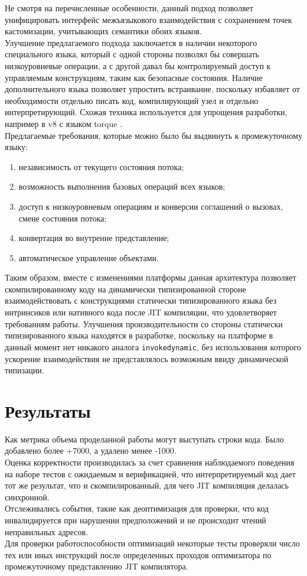 \documentclass[times,specification,annotation]{itmo-student-thesis}
\begin{document}
\chapterconclusion
Не смотря на перечисленные особенности, данный подход позволяет унифицировать интерфейс межъязыкового взаимодействия с сохранением точек кастомизации, учитывающих семантики обоих языков.\\
Улучшение предлагаемого подхода заключается в наличии некоторого специального языка, который с одной стороны позволял бы совершать низкоуровневые операции, а с другой давал бы контролируемый доступ к управляемым конструкциям, таким как безопасные состояния. Наличие дополнительного языка позволяет упростить встраивание, поскольку избавляет от необходимости отдельно писать код, компилирующий узел и отдельно интерпретирующий. Схожая техника используется для упрощения разработки, например в v8 с языком torque \cite{torque}.\\
Предлагаемые требования, которые можно было бы выдвинуть к промежуточному языку:
\begin{enumerate}
	\item независимость от текущего состояния потока;
	\item возможность выполнения базовых операций всех языков;
	\item доступ к низкоуровневым операциям и конверсии соглашений о вызовах, смене состояния потока;
	\item конвертация во внутренне представление;
	\item автоматическое управление объектами.
\end{enumerate}
Таким образом, вместе с изменениями платформы данная архитектура позволяет скомпилированному коду на динамически типизированной стороне взаимодействовать с конструкциями статически типизированного языка без интринсиков или нативного кода после JIT компиляции, что удовлетворяет требованиям работы. Улучшения производительности со стороны статически типизированного языка находятся в разработке, поскольку на платформе в данный момент нет никакого аналога \texttt{invokedynamic}, без использования которого ускорение взаимодействия не представлялось возможным ввиду динамической типизации.

\chapter{Результаты}\label{ch:results}
Как метрика объема проделанной работы могут выступать строки кода. Было добавлено более {\color{green}+7000}, а удалено менее {\color{red}-1000}.\\

Оценка корректности производилась за счет сравнения наблюдаемого поведения на наборе тестов с ожидаемым и верификацией, что интерпретируемый код дает тот же результат, что и скомпилированный, для чего JIT компиляция делалась синхронной.\\
Отслеживались события, такие как деоптимизация для проверки, что код инвалидируется при нарушении предположений и не происходит чтений неправильных адресов.\\
Для проверки работоспособности оптимизаций некоторые тесты проверяли число тех или иных инструкций после определенных проходов оптимизатора по промежуточному представлению JIT компилятора.
\end{document}

